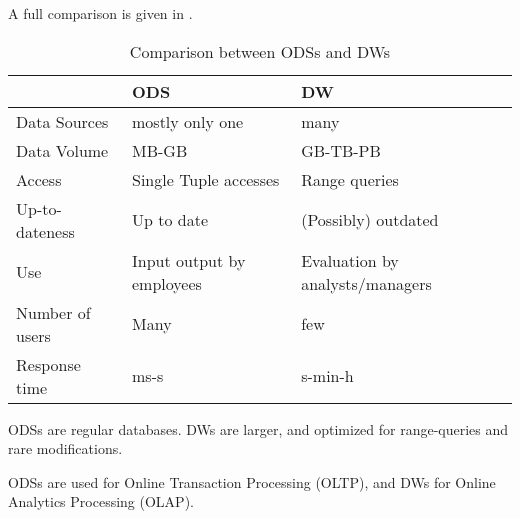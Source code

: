 \documentclass{article}
\begin{document}
A full comparison is given in .

\begin{table}[ht]
    \center
    \begin{tabular}{| l | l | l |}
        \hline
        & ODS & DW\\
        \hline
        Data Sources & mostly only one & many\\
        Data Volume & MB-GB & GB-TB-PB\\
        Access & Single Tuple accesses & Range queries\\
        Up-to-dateness & Up to date & (Possibly) outdated\\
        Use & Input output by employees & Evaluation by analysts/managers\\
        Number of users & Many & few\\
        Response time & ms-s & s-min-h\\
        \hline
    \end{tabular}
    \caption{Comparison between ODSs and DWs}
    \label{tbl:odsDwComp}
\end{table}

\begin{keypointbox}
    ODSs are regular databases.
    DWs are larger, and optimized for range-queries and rare modifications.
\end{keypointbox}

\begin{keypointbox}
    ODSs are used for Online Transaction Processing (OLTP), and DWs for Online Analytics Processing (OLAP).
\end{keypointbox}
\end{document}
